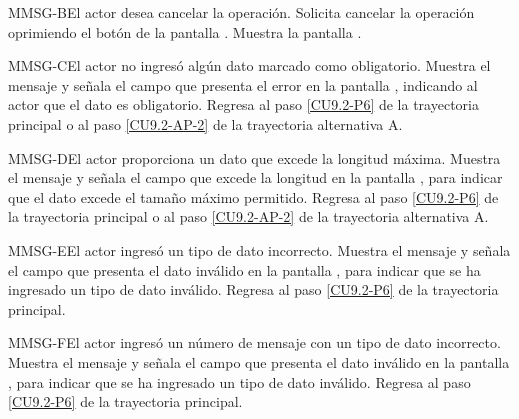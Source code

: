 	\begin{UCtrayectoriaA}{MMSG-B}{El actor desea cancelar la operación.}
		\UCpaso[\UCactor] Solicita cancelar la operación oprimiendo el botón  de la pantalla .
		\UCpaso[\UCsist] Muestra la pantalla .
	\end{UCtrayectoriaA}

	\begin{UCtrayectoriaA}{MMSG-C}{El actor no ingresó algún dato marcado como obligatorio.}
		\UCpaso[\UCsist] Muestra el mensaje  y señala el campo que presenta el error en la pantalla , indicando al actor que el dato es obligatorio.
		\UCpaso Regresa al paso \ref{CU9.2-P6} de la trayectoria principal o al paso \ref{CU9.2-AP-2} de la trayectoria alternativa A.
	\end{UCtrayectoriaA}

	\begin{UCtrayectoriaA}{MMSG-D}{El actor proporciona un dato que excede la longitud máxima.}
		\UCpaso[\UCsist] Muestra el mensaje  y señala el campo que excede la longitud en la pantalla , para indicar que el dato excede el tamaño máximo permitido.
		\UCpaso Regresa al paso \ref{CU9.2-P6} de la trayectoria principal o al paso \ref{CU9.2-AP-2} de la trayectoria alternativa A.
	\end{UCtrayectoriaA}

	\begin{UCtrayectoriaA}{MMSG-E}{El actor ingresó un tipo de dato incorrecto.}
		\UCpaso[\UCsist] Muestra el mensaje  y señala el campo que presenta el dato inválido en la pantalla , para indicar que se ha ingresado un tipo de dato inválido.
		\UCpaso Regresa al paso \ref{CU9.2-P6} de la trayectoria principal.
	\end{UCtrayectoriaA}

	\begin{UCtrayectoriaA}{MMSG-F}{El actor ingresó un número de mensaje con un tipo de dato incorrecto.}
		\UCpaso[\UCsist] Muestra el mensaje  y señala el campo que presenta el dato inválido en la pantalla , para indicar que se ha ingresado un tipo de dato inválido.
		\UCpaso Regresa al paso \ref{CU9.2-P6} de la trayectoria principal.
	\end{UCtrayectoriaA}

